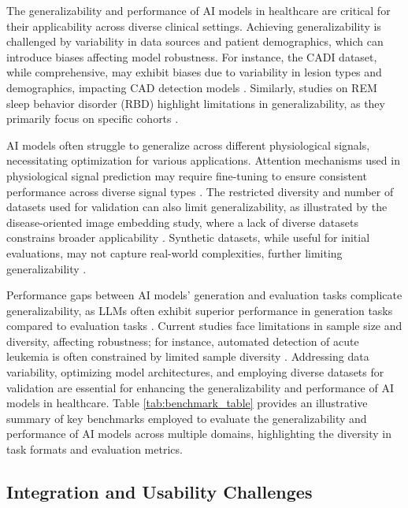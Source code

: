 The generalizability and performance of AI models in healthcare are critical for their applicability across diverse clinical settings. Achieving generalizability is challenged by variability in data sources and patient demographics, which can introduce biases affecting model robustness. For instance, the CADI dataset, while comprehensive, may exhibit biases due to variability in lesion types and demographics, impacting CAD detection models \cite{jimnezpartinen2024cadicanewdatasetcoronary}. Similarly, studies on REM sleep behavior disorder (RBD) highlight limitations in generalizability, as they primarily focus on specific cohorts \cite{cooray2019screeningremsleepbehaviour}.

AI models often struggle to generalize across different physiological signals, necessitating optimization for various applications. Attention mechanisms used in physiological signal prediction may require fine-tuning to ensure consistent performance across diverse signal types \cite{park2022attentionmechanismsphysiologicalsignal}. The restricted diversity and number of datasets used for validation can also limit generalizability, as illustrated by the disease-oriented image embedding study, where a lack of diverse datasets constrains broader applicability \cite{arai2021diseaseorientedimageembeddingpseudoscanner}. Synthetic datasets, while useful for initial evaluations, may not capture real-world complexities, further limiting generalizability \cite{shi2019newevaluationframeworktopic}.

Performance gaps between AI models' generation and evaluation tasks complicate generalizability, as LLMs often exhibit superior performance in generation tasks compared to evaluation tasks \cite{oh2024generativeaiparadoxevaluation}. Current studies face limitations in sample size and diversity, affecting robustness; for instance, automated detection of acute leukemia is often constrained by limited sample diversity \cite{zolfaghari2023surveyautomateddetectionclassification}. Addressing data variability, optimizing model architectures, and employing diverse datasets for validation are essential for enhancing the generalizability and performance of AI models in healthcare. Table \ref{tab:benchmark_table} provides an illustrative summary of key benchmarks employed to evaluate the generalizability and performance of AI models across multiple domains, highlighting the diversity in task formats and evaluation metrics.


\subsection{Integration and Usability Challenges} \label{subsec:Integration and Usability Challenges}

